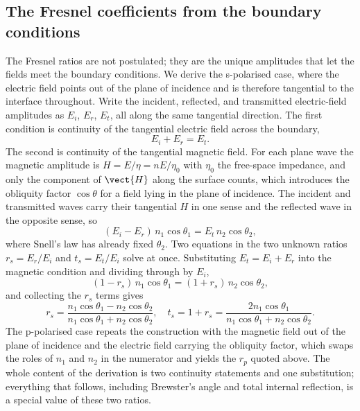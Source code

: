 

\subsection{The Fresnel coefficients from the boundary conditions}

The Fresnel ratios are not postulated; they are the unique amplitudes
that let the fields meet the boundary conditions. We derive the
s-polarised case, where the electric field points out of the plane of
incidence and is therefore tangential to the interface throughout. Write
the incident, reflected, and transmitted electric-field amplitudes as
$E_i$, $E_r$, $E_t$, all along the same tangential direction. The first
condition is continuity of the tangential electric field across the
boundary,
\[
E_i + E_r = E_t.
\]
The second is continuity of the tangential magnetic field. For each plane
wave the magnetic amplitude is $H = E/\eta = nE/\eta_0$ with $\eta_0$ the
free-space impedance, and only the component of $\vect{H}$ along the
surface counts, which introduces the obliquity factor $\cos\theta$ for a
field lying in the plane of incidence. The incident and transmitted waves
carry their tangential $H$ in one sense and the reflected wave in the
opposite sense, so
\[
(E_i - E_r)\,n_1\cos\theta_1 = E_t\,n_2\cos\theta_2,
\]
where Snell's law has already fixed $\theta_2$. Two equations in the two
unknown ratios $r_s = E_r/E_i$ and $t_s = E_t/E_i$ solve at once.
Substituting $E_t = E_i + E_r$ into the magnetic condition and dividing
through by $E_i$,
\[
(1 - r_s)\,n_1\cos\theta_1 = (1 + r_s)\,n_2\cos\theta_2,
\]
and collecting the $r_s$ terms gives
\[
r_s = \frac{n_1\cos\theta_1 - n_2\cos\theta_2}{n_1\cos\theta_1 +
n_2\cos\theta_2}, \quad t_s = 1 + r_s = \frac{2 n_1\cos\theta_1}
{n_1\cos\theta_1 + n_2\cos\theta_2}.
\]
The p-polarised case repeats the construction with the magnetic field
out of the plane of incidence and the electric field carrying the
obliquity factor, which swaps the roles of $n_1$ and $n_2$ in the
numerator and yields the $r_p$ quoted above. The whole content of the
derivation is two continuity statements and one substitution; everything
that follows, including Brewster's angle and total internal reflection,
is a special value of these two ratios.

